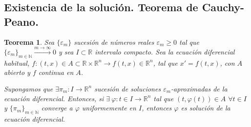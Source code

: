 \documentclass[11pt, a4paper,twoside]{article}
\theoremstyle{theorem-style}  %
\newtheorem{theorem}{Teorema}[section]  %
\theoremstyle{definition-style}
\theoremstyle{example-style}
\begin{document}
\subsection{Existencia de la solución. Teorema de Cauchy-Peano.}
\begin{theorem}\label{thm:sucesion}
	Sea $\{\varepsilon_m\}$ sucesión de números reales $\varepsilon_m \geq 0$ tal que $\{\varepsilon_m\}_{m\in \mathbb{N}}\xrightarrow{m\to \infty}0$ y sea $I \subset \mathbb{R}$ intervalo compacto. 
	Sea la ecuación diferencial habitual, $ f:(t,x) \in A \subset \mathbb{R}\times \mathbb{R}^n\longrightarrow f(t,x)\in \mathbb{R}^n$, tal que $ x'=f(t,x) $, con $A$ abierto y $f$ continua en $A$.
	
	Supongamos que $\exists \pi_m : I \longrightarrow \mathbb{R}^n$ sucesión de soluciones $\varepsilon_m$-aproximadas de la ecuación diferencial. Entonces, si $\exists \ \varphi : t \in I \longrightarrow \mathbb{R}^n$ tal que $(t, \varphi (t)) \in A$ $\forall t \in I$ y $\{\pi_m\}_{m\in \mathbb{N}}$ converge a $\varphi$ uniformemente en $I$, entonces $\varphi$ es solución de la ecuación diferencial. 
\end{theorem}
\end{document}
